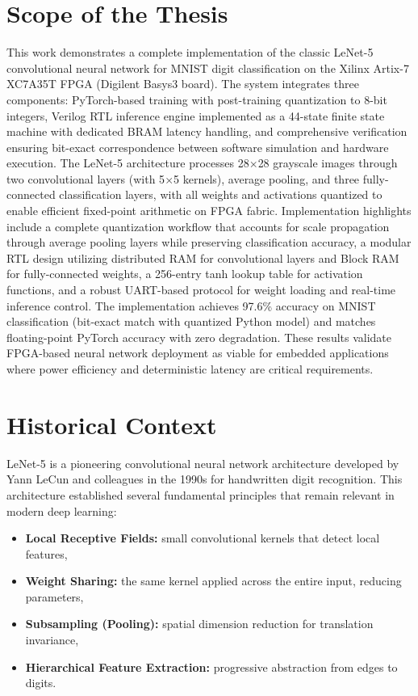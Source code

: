 \documentclass[12pt,a4paper]{report}
\begin{document}
\section{Scope of the Thesis}

This work demonstrates a complete implementation of the classic LeNet-5 convolutional neural network for MNIST digit classification on the Xilinx Artix-7 XC7A35T FPGA (Digilent Basys3 board). The system integrates three components: PyTorch-based training with post-training quantization to 8-bit integers, Verilog RTL inference engine implemented as a 44-state finite state machine with dedicated BRAM latency handling, and comprehensive verification ensuring bit-exact correspondence between software simulation and hardware execution. The LeNet-5 architecture processes 28$\times$28 grayscale images through two convolutional layers (with 5$\times$5 kernels), average pooling, and three fully-connected classification layers, with all weights and activations quantized to enable efficient fixed-point arithmetic on FPGA fabric. \parencite{lecun1998}
Implementation highlights include a complete quantization workflow that accounts for scale propagation through average pooling layers while preserving classification accuracy, a modular RTL design utilizing distributed RAM for convolutional layers and Block RAM for fully-connected weights, a 256-entry tanh lookup table for activation functions, and a robust UART-based protocol for weight loading and real-time inference control. The implementation achieves 97.6\% accuracy on MNIST classification (bit-exact match with quantized Python model) and matches floating-point PyTorch accuracy with zero degradation. These results validate FPGA-based neural network deployment as viable for embedded applications where power efficiency and deterministic latency are critical requirements.

\section{Historical Context}

LeNet-5 is a pioneering convolutional neural network architecture developed by Yann LeCun and colleagues in the 1990s for handwritten digit recognition. This architecture established several fundamental principles that remain relevant in modern deep learning:

\begin{itemize}
    \item \textbf{Local Receptive Fields:} small convolutional kernels that detect local features,
    \item \textbf{Weight Sharing:} the same kernel applied across the entire input, reducing parameters,
    \item \textbf{Subsampling (Pooling):} spatial dimension reduction for translation invariance,
    \item \textbf{Hierarchical Feature Extraction:} progressive abstraction from edges to digits.
\end{itemize}
\end{document}
